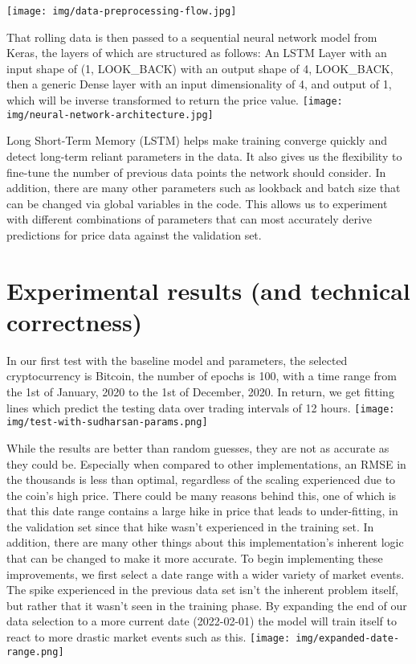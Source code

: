\documentclass[compsoc]{IEEEtran}
\begin{document}
\texttt{[image: img/data-preprocessing-flow.jpg]}

That rolling data is then passed to a sequential neural network model from Keras\cite{chollet_2020}, the layers of which are structured as follows: An LSTM Layer with an input shape of (1, LOOK\_BACK) with an output shape of 4, LOOK\_BACK, then a generic Dense layer with an input dimensionality of 4, and output of 1, which will be inverse transformed to return the price value.
\texttt{[image: img/neural-network-architecture.jpg]}

Long Short-Term Memory (LSTM) helps make training converge quickly and detect long-term reliant parameters in the data\cite{geron_2019}. It also gives us the flexibility to fine-tune the number of previous data points the network should consider. In addition, there are many other parameters such as lookback and batch size that can be changed via global variables in the code. This allows us to experiment with different combinations of parameters that can most accurately derive predictions for price data against the validation set.

\section{Experimental results (and technical correctness)} 
In our first test with the baseline model and parameters, the selected cryptocurrency is Bitcoin, the number of epochs is 100, with a time range from the 1st of January, 2020 to the 1st of December, 2020. In return, we get fitting lines which predict the testing data over trading intervals of 12 hours.
\texttt{[image: img/test-with-sudharsan-params.png]}

While the results are better than random guesses, they are not as accurate as they could be. Especially when compared to other implementations, an RMSE in the thousands is less than optimal, regardless of the scaling experienced due to the coin's high price. There could be many reasons behind this, one of which is that this date range contains a large hike in price that leads to under-fitting, in the validation set since that hike wasn't experienced in the training set. In addition, there are many other things about this implementation's inherent logic that can be changed to make it more accurate.
To begin implementing these improvements, we first select a date range with a wider variety of market events. The spike experienced in the previous data set isn't the inherent problem itself, but rather that it wasn't seen in the training phase. By expanding the end of our data selection to a more current date (2022-02-01) the model will train itself to react to more drastic market events such as this. 
\texttt{[image: img/expanded-date-range.png]}
\end{document}
